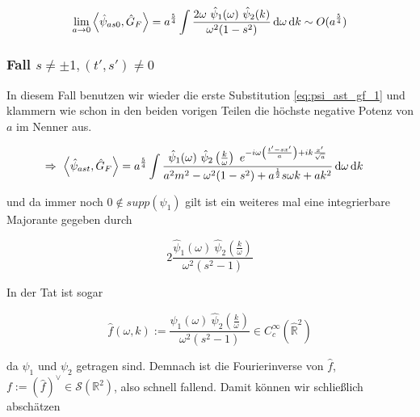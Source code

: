\begin{equation}
    \lim_{a \rightarrow 0} \left< \hat\psi_{as0}, \hat G_F \right> =
    a^{\frac{5}{4}} \int \frac{2 \omega ~\hat \psi_1(\omega) ~\hat \psi_2(k)}
    {\omega^2 (1-s^2)}
    \mathop{}\!\mathrm{d} \omega \mathop{}\!\mathrm{d} k
    \sim O(a^{\frac{5}{4}})
    \label{eq:gf_s_neq_1_xt=0}
\end{equation}


\subsubsection*{Fall $s \neq \pm 1, (t', s') \neq 0$}
In diesem Fall benutzen wir wieder die erste Substitution \eqref{eq:psi_ast_gf_1}
und klammern wie schon in den beiden vorigen Teilen die höchste negative
Potenz von $a$ im Nenner aus.

\begin{align}
\Rightarrow ~
    \left< \hat\psi_{ast}, \hat G_F \right>
    &=
    a^{\frac{5}{4}} \int \frac{
        \hat \psi_1 (\omega) ~\hat \psi_2 \left(\frac{k}{\omega}\right)
        ~ e^{-i \omega \left(\frac{t'-sx'}{a}\right) + i k \frac{x'}{\sqrt{a}}}
    }
    {
        a^2 m^2 - \omega^2 (1-s^2) + a^{\frac{1}{2}} s \omega k +a k^2
    }
    \mathop{}\!\mathrm{d} \omega \mathop{}\!\mathrm{d} k
\end{align}

und da immer noch $0 \notin supp(\psi_1)$ gilt ist ein weiteres mal eine integrierbare Majorante gegeben durch

\begin{equation}
    2\frac{\hat \psi_1 (\omega)~\hat\psi_2 \left(\frac{k}{\omega}\right)}
    {\omega^2(s^2-1)}
\end{equation}

In der Tat ist sogar

\begin{equation}
    \hat f(\omega, k) := \frac{\hat \psi_1 (\omega)~\hat\psi_2 \left(\frac{k}{\omega}\right)}
    {\omega^2(s^2-1)}
    \in C_c^\infty (\hat{\mathbb{R}}^2)
\end{equation}

da $\psi_1$ und $\psi_2$ getragen sind. Demnach ist die Fourierinverse von
$\hat f$, $f := (\hat f)^\vee \in \mathcal{S}(\mathbb{R}^2)$, also schnell
fallend. Damit können wir schließlich abschätzen

